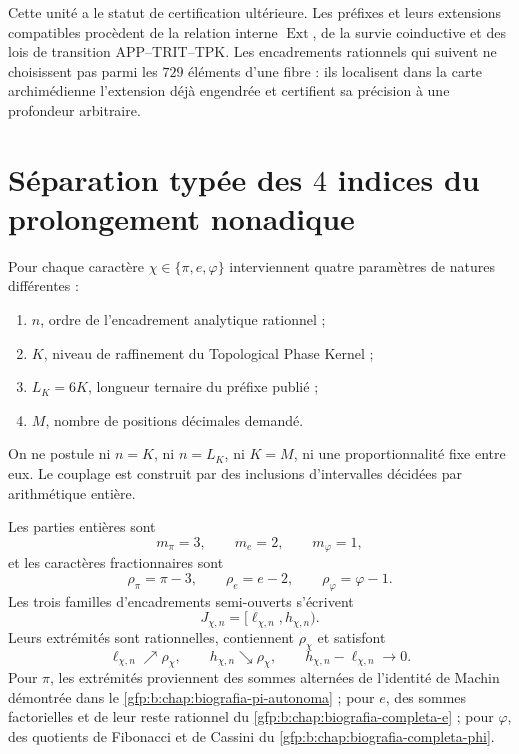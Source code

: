 
\label{gfp:b:chap:precision-arbitraria-constantes}

Cette unité a le statut de certification ultérieure. Les préfixes et leurs
extensions compatibles procèdent de la relation interne
\(\operatorname{Ext}\), de la survie coinductive et des lois de
transition APP--TRIT--TPK. Les encadrements rationnels qui suivent ne choisissent pas
parmi les \(729\) éléments d’une fibre : ils localisent dans la carte archimédienne
l’extension déjà engendrée et certifient sa précision à une profondeur arbitraire.

\section{Séparation typée des \(4\) indices du prolongement nonadique}

Pour chaque caractère \(\chi\in\{\pi,e,\varphi\}\) interviennent quatre
paramètres de natures différentes :
\begin{enumerate}
 \item \(n\), ordre de l’encadrement analytique rationnel ;
 \item \(K\), niveau de raffinement du Topological Phase Kernel ;
 \item \(L_K=6K\), longueur ternaire du préfixe publié ;
 \item \(M\), nombre de positions décimales demandé.
\end{enumerate}
On ne postule ni \(n=K\), ni \(n=L_K\), ni \(K=M\), ni une proportionnalité fixe
entre eux. Le couplage est construit par des inclusions d’intervalles
décidées par arithmétique entière.

Les parties entières sont
\[
 m_\pi=3,
 \qquad
 m_e=2,
 \qquad
 m_\varphi=1,
\]
et les caractères fractionnaires sont
\[
 \rho_\pi=\pi-3,
 \qquad
 \rho_e=e-2,
 \qquad
 \rho_\varphi=\varphi-1.
\]
Les trois familles d’encadrements semi-ouverts s’écrivent
\[
 J_{\chi,n}=[\ell_{\chi,n},h_{\chi,n}).
\]
Leurs extrémités sont rationnelles, contiennent \(\rho_\chi\) et satisfont
\[
 \ell_{\chi,n}\nearrow\rho_\chi,
 \qquad
 h_{\chi,n}\searrow\rho_\chi,
 \qquad
 h_{\chi,n}-\ell_{\chi,n}\longrightarrow0.
\]
Pour \(\pi\), les extrémités proviennent des sommes alternées de l’identité
de Machin démontrée dans le \cref{gfp:b:chap:biografia-pi-autonoma} ; pour \(e\),
des sommes factorielles et de leur reste rationnel du
\cref{gfp:b:chap:biografia-completa-e} ; pour \(\varphi\), des quotients de
Fibonacci et de Cassini du \cref{gfp:b:chap:biografia-completa-phi}.

